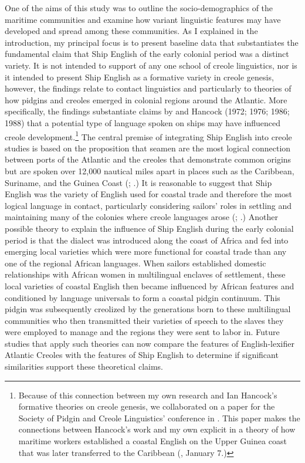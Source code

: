 One of the aims of this study was to outline the socio-demographics of the maritime communities and examine how variant linguistic features may have developed and spread among these communities. As I explained in the introduction, my principal focus is to present baseline data that substantiates the fundamental claim that Ship English of the early colonial period was a distinct variety. It is not intended to support of any one school of creole linguistics, nor is it intended to present Ship English as a formative variety in creole genesis, however, the findings relate to contact linguistics and particularly to theories of how pidgins and creoles emerged in colonial regions around the Atlantic. More specifically, the findings substantiate claims by \citet{Reinecke1938} and Hancock (1972; 1976; 1986; 1988) that a potential type of language spoken on ships may have influenced creole development.\footnote{Because of this connection between my own research and Ian Hancock’s formative theories on creole genesis, we collaborated on a paper for the Society of Pidgin and Creole Linguistics’ conference in \citealt{January2017}. This paper makes the connections between Hancock’s work and my own explicit in a theory of how maritime workers established a coastal English on the Upper Guinea coast that was later transferred to the Caribbean (\citealt{DelgadoHancock2017}, January 7.)} The central premise of integrating Ship English into creole studies is based on the proposition that seamen are the most logical connection between ports of the Atlantic and the creoles that demonstrate common origins but are spoken over 12,000 nautical miles apart in places such as the Caribbean, Suriname, and the Guinea Coast (\citealt{Hancock1976}; \citealt{FaraclasEtAl2012}.) It is reasonable to suggest that Ship English was the variety of English used for coastal trade and therefore the most logical language in contact, particularly considering sailors’ roles in settling and maintaining many of the colonies where creole languages arose (\citealt{BaileyRoss1988}; \citealt{Holm1988}.) Another possible theory to explain the influence of Ship English during the early colonial period is that the dialect was introduced along the coast of Africa and fed into emerging local varieties which were more functional for coastal trade than any one of the regional African languages. When sailors established domestic relationships with African women in multilingual enclaves of settlement, these local varieties of coastal English then became influenced by African features and conditioned by language universals to form a coastal pidgin continuum. This pidgin was subsequently creolized by the generations born to these multilingual communities who then transmitted their varieties of speech to the slaves they were employed to manage and the regions they were sent to labor in. Future studies that apply such theories can now compare the features of English-lexifier Atlantic Creoles with the features of Ship English to determine if significant similarities support these theoretical claims. 

